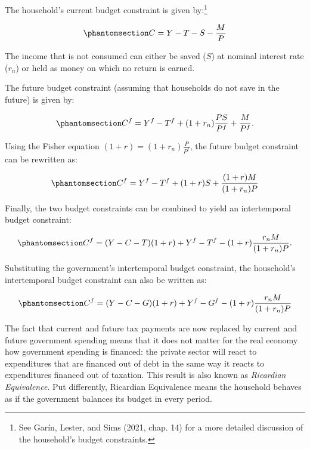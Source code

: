 \documentclass[
  letterpaper,
  DIV=11,
  numbers=noendperiod]{scrreprt}
\begin{document}
The household's current budget constraint is given by:\footnote{See
  Garín, Lester, and Sims (2021, chap. 14) for a more detailed
  discussion of the household's budget constraints.}

\begin{equation}\phantomsection\label{eq-Hbc}{
C=Y-T-S-\frac{M}{P}
}\end{equation}

The income that is not consumed can either be saved (\(S\)) at nominal
interest rate (\(r_n\)) or held as money on which no return is earned.

The future budget constraint (assuming that households do not save in
the future) is given by:

\begin{equation}\phantomsection\label{eq-Cf}{
C^f = Y^f - T^f + (1+r_n)\frac{PS}{P^f} + \frac{M}{P^f}.
}\end{equation}

Using the Fisher equation \((1+r)=(1+r_n)\frac{P}{P^f}\), the future
budget constraint can be rewritten as:

\begin{equation}\phantomsection\label{eq-Cf2}{
C^f = Y^f  - T^f + (1+r)S + \frac{(1+r)M}{(1+r_n)P}
}\end{equation}

Finally, the two budget constraints can be combined to yield an
intertemporal budget constraint:

\begin{equation}\phantomsection\label{eq-Hbcit}{
C^f = (Y-C-T)(1+r)+Y^f -T^f - (1+r)\frac{r_nM}{(1+r_n)P}.
}\end{equation}

Substituting the government's intertemporal budget constraint, the
household's intertemporal budget constraint can also be written as:

\begin{equation}\phantomsection\label{eq-ibc}{
C^f = (Y-C-G)(1+r)+Y^f -G^f - (1+r)\frac{r_nM}{(1+r_n)P}
}\end{equation}

The fact that current and future tax payments are now replaced by
current and future government spending means that it does not matter for
the real economy how government spending is financed: the private sector
will react to expenditures that are financed out of debt in the same way
it reacts to expenditures financed out of taxation. This result is also
known as \emph{Ricardian Equivalence}. Put differently, Ricardian
Equivalence means the household behaves as if the government balances
its budget in every period.
\end{document}
